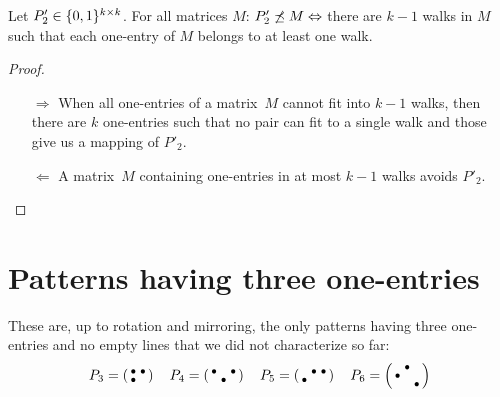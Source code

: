\pagebreak
\begin{prop}
\label{prop:walking}
Let $P'_2\in\{0,1\}^{k\times k}$. For all matrices $M$: $P'_2\not\preceq M\Leftrightarrow$ there are $k-1$ walks in $M$ such that each one-entry of $M$ belongs to at least one walk.
\end{prop}
\begin{proof}
\begin{itemize}
	\item[$\Rightarrow$] When all one-entries of a matrix~$M$ cannot fit into $k-1$ walks, then there are $k$ one-entries such that no pair can fit to a single walk and those give us a mapping of $P'_2$.
	\item[$\Leftarrow$] A matrix~$M$ containing one-entries in at most $k-1$ walks avoids $P'_2$. \qedhere
\end{itemize}
\end{proof}

\section{Patterns having three one-entries}
\label{sec:3ones}
These are, up to rotation and mirroring, the only patterns having three one-entries and no empty lines that we did not characterize so far:
$$P_3=\smm{\bullet&\bullet\\\bullet& }\ \ 
\ P_4=\smm{\bullet& &\bullet\\ &\bullet& }\ \ 
\ P_5=\smm{ &\bullet&\bullet\\\bullet& & }\ \ 
\ P_6=\smm{ &\bullet& \\\bullet& & \\ & &\bullet}$$

